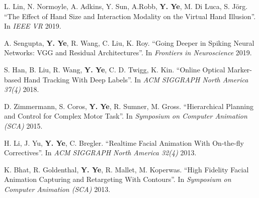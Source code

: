 \documentclass[margin,line]{res}
\begin{document}
\begin{resume}
\vspace*{-.1in}
L. Lin, N. Normoyle, A. Adkins, Y. Sun, A.Robb, {\bf Y. Ye}, M. Di Luca, S. J\"{o}rg. ``The Effect of Hand Size and Interaction Modality on the Virtual Hand Illusion''. In {\em IEEE VR} 2019.


\vspace*{-.1in}
A. Sengupta, {\bf Y. Ye}, R. Wang, C. Liu, K. Roy. ``Going Deeper in Spiking Neural Networks: VGG and Residual Architectures''. In {\em Frontiers in Neuroscience} 2019.

\vspace*{-.1in}
S. Han, B. Liu, R. Wang, {\bf Y. Ye}, C. D. Twigg, K. Kin. ``Online Optical Marker-based Hand Tracking With Deep Labels''. In {\em ACM SIGGRAPH North America 37(4)} 2018.


\vspace*{-.1in}
D. Zimmermann, S. Coros, {\bf Y. Ye}, R. Sumner, M. Gross. ``Hierarchical Planning and Control for Complex Motor Task''. In {\em Symposium on Computer Animation (SCA)} 2015.



\vspace*{-.1in}
H. Li, J. Yu, {\bf Y. Ye}, C. Bregler. ``Realtime Facial Animation With On-the-fly Correctives''. In {\em ACM SIGGRAPH North America 32(4)} 2013.

\vspace*{-.1in}
K. Bhat, R. Goldenthal, {\bf Y. Ye}, R. Mallet, M. Koperwas. ``High Fidelity Facial Animation Capturing and Retargeting With Contours''. In {\em Symposium on Computer Animation (SCA)} 2013. 


\end{resume}
\end{document}
